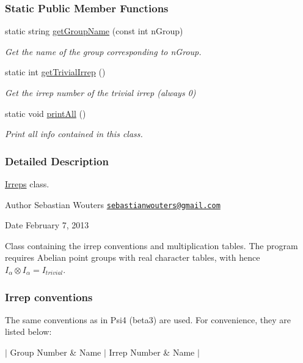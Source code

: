 \subsubsection*{Static Public Member Functions}
\begin{DoxyCompactItemize}
\item 
static string \hyperlink{classCheMPS2_1_1Irreps_a136f15adb9e7f5bcf10af028bb1cec6d}{get\-Group\-Name} (const int n\-Group)
\begin{DoxyCompactList}\small\item\em Get the name of the group corresponding to n\-Group. \end{DoxyCompactList}\item 
static int \hyperlink{classCheMPS2_1_1Irreps_adde5a163d7bc76f80ce73269e9101698}{get\-Trivial\-Irrep} ()
\begin{DoxyCompactList}\small\item\em Get the irrep number of the trivial irrep (always 0) \end{DoxyCompactList}\item 
\hypertarget{classCheMPS2_1_1Irreps_afd70b3b21e33a3f8163db04a768ef848}{static void \hyperlink{classCheMPS2_1_1Irreps_afd70b3b21e33a3f8163db04a768ef848}{print\-All} ()}\label{classCheMPS2_1_1Irreps_afd70b3b21e33a3f8163db04a768ef848}

\begin{DoxyCompactList}\small\item\em Print all info contained in this class. \end{DoxyCompactList}\end{DoxyCompactItemize}


\subsubsection{Detailed Description}
\hyperlink{classCheMPS2_1_1Irreps}{Irreps} class. \begin{DoxyAuthor}{Author}
Sebastian Wouters \href{mailto:sebastianwouters@gmail.com}{\tt sebastianwouters@gmail.\-com} 
\end{DoxyAuthor}
\begin{DoxyDate}{Date}
February 7, 2013
\end{DoxyDate}
Class containing the irrep conventions and multiplication tables. The program requires Abelian point groups with real character tables, with hence $I_{\alpha} \otimes I_{\alpha} = I_{trivial}$.\hypertarget{classCheMPS2_1_1Irreps_irreps_conv}{}\subsubsection{Irrep conventions}\label{classCheMPS2_1_1Irreps_irreps_conv}
The same conventions as in Psi4 (beta3) are used. For convenience, they are listed below\-:\par
 $|$ Group Number \& Name $|$ Irrep Number \& Name $|$ \par
  
